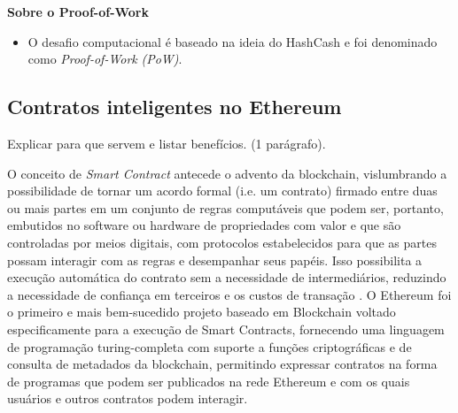 \documentclass[a4paper,11pt]{article}
\begin{document}
 \textbf{Sobre o Proof-of-Work}

\begin{itemize}
    \item O desafio computacional é baseado na ideia do HashCash \cite{Back2002} e foi denominado como \emph{Proof-of-Work} \emph{(PoW)}.
\end{itemize}
\subsection{Contratos inteligentes no Ethereum} \label{sub:sec:contratos-ethereum}

{\color{ForestGreen}Explicar para que servem e listar benefícios. (1 parágrafo).}

O conceito de \emph{Smart Contract} antecede o advento da blockchain, vislumbrando a possibilidade  de tornar um acordo formal (i.e. um contrato) firmado entre duas ou mais partes em um conjunto de regras computáveis que podem ser, portanto, embutidos no software ou hardware de propriedades com valor e que são controladas por meios digitais, com protocolos estabelecidos para que as partes possam interagir com as regras e desempanhar seus papéis.
Isso possibilita a execução automática do contrato sem a necessidade de intermediários, reduzindo a necessidade de confiança em terceiros e os custos de transação \cite{Bartoletti2019, Szabo1996}.
O Ethereum foi o primeiro e mais bem-sucedido projeto baseado em Blockchain voltado especificamente para a execução de Smart Contracts, fornecendo uma linguagem de programação turing-completa com suporte a funções criptográficas e de consulta de metadados da blockchain, permitindo expressar contratos na forma de programas que podem ser publicados na rede Ethereum e com os quais usuários e outros contratos podem interagir.
\end{document}
